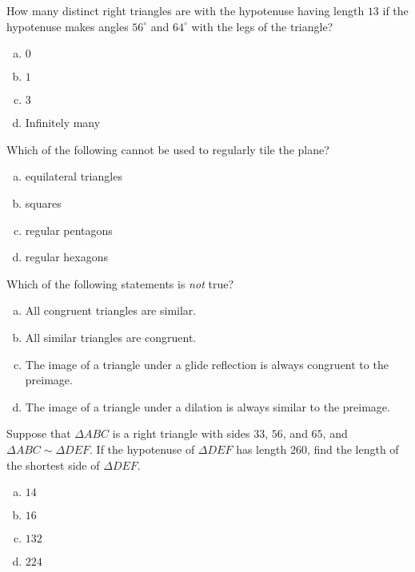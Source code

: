 \documentclass[12pt,letterpaper]{exam}
\begin{document}
\begin{questions}
\question How many distinct right triangles are with the hypotenuse having length $13$ if the hypotenuse makes angles $56^\circ$ and $64^\circ$ with the legs of the triangle?
	\begin{enumerate}[(a)]
	\item $0$
	\item $1$
	\item $3$
	\item Infinitely many 
	\end{enumerate} \vfill



\newpage



\question Which of the following cannot be used to regularly tile the plane?
	\begin{enumerate}[(a)]
	\item equilateral triangles
	\item squares
	\item regular pentagons
	\item regular hexagons
	\end{enumerate} \vfill



\question Which of the following statements is \textit{not} true?
	\begin{enumerate}[(a)]
	\item All congruent triangles are similar. 
	\item All similar triangles are congruent. 
	\item The image of a triangle under a glide reflection is always congruent to the preimage. 
	\item The image of a triangle under a dilation is always similar to the preimage. 
	\end{enumerate} \vfill



\question Suppose that $\Delta ABC$ is a right triangle with sides $33$, $56$, and $65$, and $\Delta ABC \sim \Delta DEF$. If the hypotenuse of $\Delta DEF$ has length $260$, find the length of the shortest side of $\Delta DEF$.
	\begin{enumerate}[(a)]
	\item $14$
	\item $16$
	\item $132$
	\item $224$
	\end{enumerate} \vfill




\end{questions}
\end{document}
